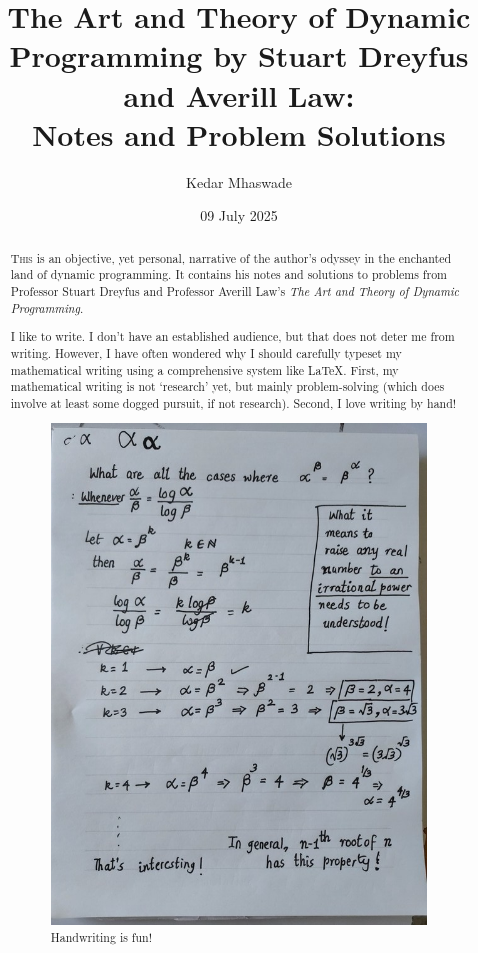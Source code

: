 \documentclass[english,notitlepage,smartquotes]{hgbreport}
\theoremstyle{definition}
\theoremstyle{definition}
\theoremstyle{remark}
\theoremstyle{definition}
\theoremstyle{plain}
\theoremstyle{definition}
\begin{document}
\author{Kedar Mhaswade}                    %
\title{The Art and Theory of Dynamic Programming by Stuart Dreyfus and Averill Law:\\ %
			Notes and Problem Solutions}	                 %
\date{09 July 2025}

\maketitle
\begin{abstract}\noindent

\bigskip
\noindent
\lettrine[lines=3]{T}{his} is an objective, yet personal, narrative of the author's odyssey in the enchanted land of dynamic programming. It contains his notes and solutions to problems from Professor Stuart Dreyfus and Professor Averill Law's \cite{DreyfusLaw1977} \textit{The Art and Theory of Dynamic Programming}.


I like to write. I don't have an established audience, but that does not deter me from writing. However, I have often wondered why I should carefully typeset my mathematical writing using a comprehensive system like \LaTeX. First, my mathematical writing is not `research' yet, but mainly problem-solving (which does involve at least some dogged pursuit, if not research). Second, I love writing by hand! 
\begin{figure}[!h]
\begin{center}
\caption{Handwriting is fun!}
\includegraphics[width=.345\textwidth,angle=-90]{loving-to-write-by-hand-small}
\end{center}
\end{figure}


\end{abstract}
\end{document}

